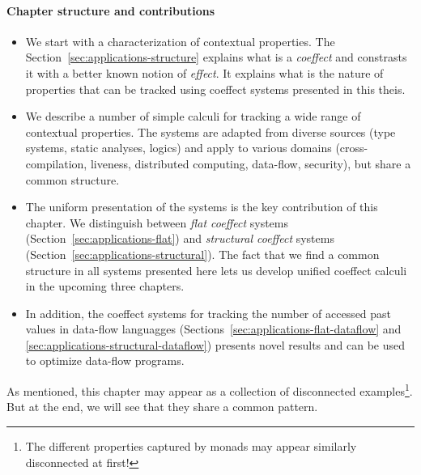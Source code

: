 \paragraph{Chapter structure and contributions}
\begin{itemize}
\item We start with a characterization of contextual properties. The Section~\ref{sec:applications-structure}
  explains what is a \emph{coeffect} and constrasts it with a better known notion of 
  \emph{effect}. It explains what is the nature of properties that can be tracked using 
  coeffect systems presented in this theis.

\item We describe a number of simple calculi for tracking a wide range of contextual properties. 
  The systems are adapted from diverse sources (type systems, static analyses, logics) and apply to
  various domains (cross-compilation, liveness, distributed computing, data-flow, security), but
  share a common structure.

\item The uniform presentation of the systems is the key contribution of this chapter. We distinguish
  between \emph{flat coeffect} systems (Section~\ref{sec:applications-flat}) and \emph{structural coeffect}
  systems (Section~\ref{sec:applications-structural}). The fact that we find a common structure in
  all systems presented here lets us develop unified coeffect calculi in the upcoming three chapters.

\item In addition, the coeffect systems for tracking the number of accessed past values in 
  data-flow languagges (Sections~\ref{sec:applications-flat-dataflow} and \ref{sec:applications-structural-dataflow})
  presents novel results and can be used to optimize data-flow programs.
\end{itemize}

\noindent
As mentioned, this chapter may appear as a collection of disconnected 
examples\footnote{The different properties captured by monads may appear similarly 
disconnected at first!}. But at the end, we will see that they share a common pattern.


%	                                                               
%

